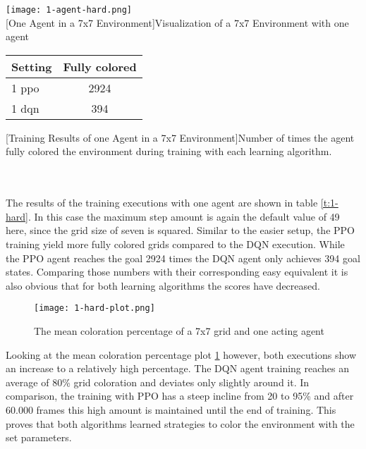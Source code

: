 \begin{minipage}{\textwidth}
  \begin{minipage}[b]{0.29\textwidth}
    \centering
    \texttt{[image: 1-agent-hard.png]}\\
    [One Agent in a 7x7 Environment]{Visualization of a 7x7 Environment with one agent}\label{fig:1-hard}
  \end{minipage}
  \hfill
  \begin{minipage}[b]{0.69\textwidth}
    \centering
    \begin{tabular}{lc}\hline
      Setting & Fully colored \\ \hline
        1 ppo & 2924 \\
        1 dqn & 394 \\ \hline
      \end{tabular}
      [Training Results of one Agent in a 7x7 Environment]{Number of times the agent fully colored the environment during training with each learning algorithm.\\ }\label{t:1-hard}
    \end{minipage}
  \end{minipage}\\\\

The results of the training executions with one agent are shown in table \ref{t:1-hard}. In this case the maximum step amount is again the default value of 49 here, since the grid size of seven is squared. Similar to the easier setup, the PPO training yield more fully colored grids compared to the DQN execution. While the PPO agent reaches the goal 2924 times the DQN agent only achieves 394 goal states. Comparing those numbers with their corresponding easy equivalent it is also obvious that for both learning algorithms the scores have decreased.

\begin{figure}[hpbt]
    \centering
    \texttt{[image: 1-hard-plot.png]}\\
    \caption[Mean Coloration Percentage of one Agent in a 7x7 Environment]{The mean coloration percentage of a 7x7 grid and one acting agent}\label{fig:1-hard-plot}
\end{figure}

Looking at the mean coloration percentage plot \ref{fig:1-hard-plot} however, both executions show an increase to a relatively high percentage. The DQN agent training reaches an average of 80\% grid coloration and deviates only slightly around it. In comparison, the training with PPO has a steep incline from 20 to 95\% and after 60.000 frames this high amount is maintained until the end of training. This proves that both algorithms learned strategies to color the environment with the set parameters.

